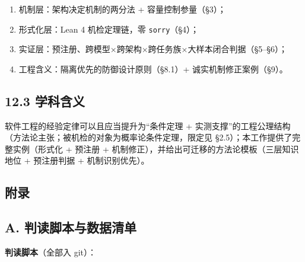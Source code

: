 \documentclass[
]{ctexart}
\providecommand{\tightlist}{%
  \setlength{\itemsep}{0pt}\setlength{\parskip}{0pt}}
\begin{document}
\begin{enumerate}
\def\labelenumi{\arabic{enumi}.}
\tightlist
\item
  机制层：架构决定机制的两分法 + 容量控制参量（§3）；
\item
  形式化层：Lean 4 机检定理链，零 \texttt{sorry}（§4）；
\item
  实证层：预注册、跨模型×跨架构×跨任务族×大样本闭合判据（§5--§6）；
\item
  工程含义：隔离优先的防御设计原则（§8.1）+ 诚实机制修正案例（§9）。
\end{enumerate}

\subsection{12.3 学科含义}\label{ux5b66ux79d1ux542bux4e49}

软件工程的经验定律可以且应当提升为``条件定理 +
实测支撑''的工程公理结构（方法论主张；被机检的对象为概率论条件定理，限定见
§2.5）；本工作提供了完整实例（形式化 + 预注册 +
机制修正），并给出可迁移的方法论模板（三层知识地位 + 预注册判据 +
机制识别优先）。

\subsection{附录}\label{ux9644ux5f55}

\subsection{A.
判读脚本与数据清单}\label{a.-ux5224ux8bfbux811aux672cux4e0eux6570ux636eux6e05ux5355}

\textbf{判读脚本}（全部入 git）：
\end{document}
